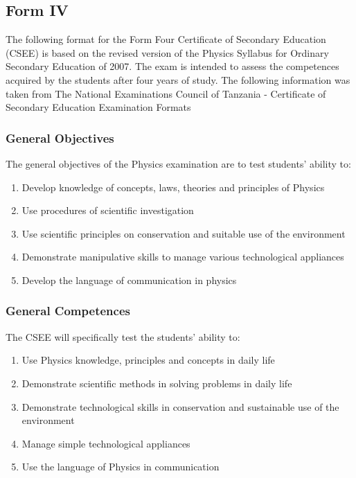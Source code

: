 \subsection{Form IV}
\noindent The following format for the Form Four Certificate of Secondary Education (CSEE) is based on the revised version of the Physics Syllabus for Ordinary Secondary Education of 2007. The exam is intended to assess the competences acquired by the students after four years of study. The following information was taken from The National Examinations Council of Tanzania - Certificate of Secondary Education Examination Formats %

\subsubsection{General Objectives}
\noindent The general objectives of the Physics examination are to test students' ability to:
\begin{enumerate}[topsep=1ex,itemsep=0ex,partopsep=1ex,parsep=1ex]
	\item Develop knowledge of concepts, laws, theories and principles of Physics
	\item Use procedures of scientific investigation
	\item Use scientific principles on conservation and suitable use of the environment
	\item Demonstrate manipulative skills to manage various technological appliances
	\item Develop the language of communication in physics
\end{enumerate}

\subsubsection{General Competences}
\noindent The CSEE will specifically test the students' ability to:
\begin{enumerate}[topsep=1ex,itemsep=0ex,partopsep=1ex,parsep=1ex]
	\item Use Physics knowledge, principles and concepts in daily life
	\item Demonstrate scientific methods in solving problems in daily life
	\item Demonstrate technological skills in conservation and sustainable use of the environment
	\item Manage simple technological appliances
	\item Use the language of Physics in communication
\end{enumerate}

